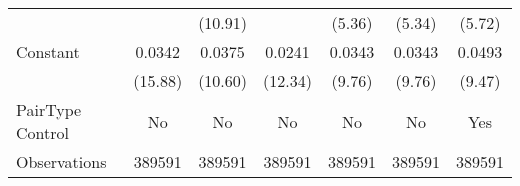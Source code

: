 {\begin{tabular}{l*{6}{c}}
                    &                     &     (10.91)         &                     &      (5.36)         &      (5.34)         &      (5.72)         \\
[1em]
Constant            &      0.0342\sym{***}&      0.0375\sym{***}&      0.0241\sym{***}&      0.0343\sym{***}&      0.0343\sym{***}&      0.0493\sym{***}\\
                    &     (15.88)         &     (10.60)         &     (12.34)         &      (9.76)         &      (9.76)         &      (9.47)         \\
\hline
PairType Control    &          No         &          No         &          No         &          No         &          No         &         Yes         \\
Observations        &      389591         &      389591         &      389591         &      389591         &      389591         &      389591         \\
\hline\hline  \end{tabular}}
